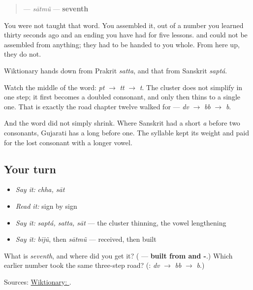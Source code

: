 \begin{quote}
\textbf{} — \emph{sātmũ} — \textbf{seventh}
\end{quote}

You were not taught that word. You assembled it, out of a number you learned thirty seconds ago and an ending you have had for five lessons. \textbf{} and \textbf{} could not be assembled from anything; they had to be handed to you whole. From here up, they do not.

\begin{cousinweb}
Wiktionary hands \textbf{} down from Prakrit \emph{satta}, and that from Sanskrit \emph{saptá}.

Watch the middle of the word: \emph{pt} $\to$ \emph{tt} $\to$ \emph{t}. The cluster does not simplify in one step; it first becomes a doubled consonant, and only then thins to a single one. That is exactly the road chapter twelve walked for \textbf{} — \emph{dv} $\to$ \emph{bb} $\to$ \emph{b}.

And the word did not simply shrink. Where Sanskrit had a short \emph{a} before two consonants, Gujarati has a long \textbf{} before one. The syllable kept its weight and paid for the lost consonant with a longer vowel.
\end{cousinweb}

\subsection*{Your turn}
\begin{itemize}
\raggedright
  \item \emph{Say it:} \emph{chha, sāt}
  \item \emph{Read it:} \textbf{} sign by sign
  \item \emph{Say it:} \emph{saptá, satta, sāt} — the cluster thinning, the vowel lengthening
  \item \emph{Say it:} \emph{bījũ}, then \emph{sātmũ} — received, then built
\end{itemize}

\begin{tcolorbox}[breakable,colback=teal!4,colframe=teal!35!black,title={Before you move on}]
What is \emph{seventh}, and where did you get it? (\textbf{} — \textbf{built from  and -}.) Which earlier number took the same three-step road? (\textbf{}: \emph{dv} $\to$ \emph{bb} $\to$ \emph{b}.)

Sources: \href{https://en.wiktionary.org/wiki/\%E0\%AA\%B8\%E0\%AA\%BE\%E0\%AA\%A4}{Wiktionary: }.
\end{tcolorbox}
